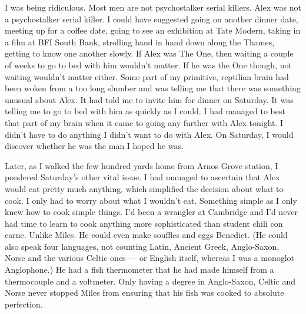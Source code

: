 I was being ridiculous. Most men are not psychostalker serial
killers. Alex was not a psychostalker serial killer. I could have
suggested going on another dinner date, meeting up for a coffee
date, going to see an exhibition at Tate Modern, taking in a film at
BFI South Bank, strolling hand in hand down along the Thames,
getting to know one another slowly. If Alex was The One, then
waiting a couple of weeks to go to bed with him wouldn't matter. If
he was the One though, {\twelveit not\/} waiting wouldn't matter
either. Some part of my primitive, reptilian brain had been woken
from a too long slumber and was telling me that there was something
unusual about Alex. It had told me to invite him for dinner on
Saturday. It was telling me to go to bed with him as quickly as I
could. I had managed to best that part of my brain when it came to
going any further with Alex tonight. I didn't have to do anything I
didn't want to do with Alex. On Saturday, I would discover whether he
was the man I hoped he was.

Later, as I walked the few hundred yards home from Arnos Grove
station, I pondered Saturday's other vital issue. I had managed to
ascertain that Alex would eat pretty much anything, which simplified
the decision about what to cook. I only had to worry about what
{\twelveit I\/} wouldn't eat. Something simple as I only knew how to
cook simple things. I'd been a wrangler at Cambridge and I'd never
had time to learn to cook anything more sophisticated than student
chili con carne. Unlike Miles. He could even make souffles and eggs
Benedict. (He could also speak four languages, not counting Latin,
Ancient Greek, Anglo-Saxon, Norse and the various Celtic ones --- or
English itself, whereas I was a monoglot Anglophone.) He had a fish
thermometer that he had made himself from a thermocouple and a
voltmeter. Only having a degree in Anglo-Saxon, Celtic and Norse
never stopped Miles from ensuring that his fish was cooked to
absolute perfection.

